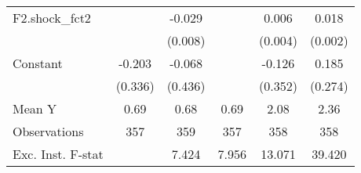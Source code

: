 {\begin{tabular}{l*{5}{c}}
\addlinespace
F2.shock\_fct2       &                     &      -0.029\sym{***}&                     &       0.006         &       0.018\sym{***}\\
                    &                     &     (0.008)         &                     &     (0.004)         &     (0.002)         \\
\addlinespace
Constant            &      -0.203         &      -0.068         &                     &      -0.126         &       0.185         \\
                    &     (0.336)         &     (0.436)         &                     &     (0.352)         &     (0.274)         \\
\midrule
Mean Y              &        0.69         &        0.68         &        0.69         &        2.08         &        2.36         \\
Observations        &         357         &         359         &         357         &         358         &         358         \\
Exc. Inst. F-stat   &                     &       7.424         &       7.956         &      13.071         &      39.420         \\
\bottomrule
\end{tabular}
}
